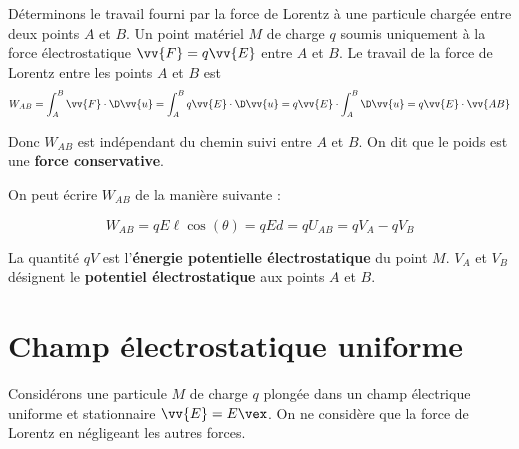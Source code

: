 \documentclass{cours}
\begin{document}
Déterminons le travail fourni par la force de Lorentz à une particule chargée entre deux points $A$ et $B$. Un point matériel $M$ de charge $q$ soumis uniquement à la force électrostatique $\vv{F} = q\vv{E}$ entre $A$ et $B$. Le travail de la force de Lorentz entre les points $A$ et $B$ est 
\begin{equation}
W_{AB} = \int_A^B\vv{F}\cdot\D \vv{u} = \int_A^B q\vv{E}\cdot\D \vv{u} = q\vv{E}\cdot\int_A^B\D\vv{u} = q\vv{E}\cdot\vv{AB}
\end{equation}

Donc $W_{AB}$ est indépendant du chemin suivi entre $A$ et $B$. On dit que le poids est une \textbf{force conservative}.

On peut écrire $W_{AB}$ de la manière suivante :
\begin{center}
\end{center}

\begin{equation}
W_{AB} = qE\ell\cos(\theta) = qEd = qU_{AB} = qV_A-qV_B 
\end{equation}

La quantité $qV$ est l'\textbf{énergie potentielle électrostatique} du point $M$. $V_A$ et $V_B$ désignent le \textbf{potentiel électrostatique} aux points $A$ et $B$.  
\section{Champ électrostatique uniforme}%
\label{sec:mouvement_dans_un_champ_electrique_uniforme}

Considérons une particule $M$ de charge $q$ plongée dans un champ électrique uniforme et stationnaire $\vv{E} = E \vex$. On ne considère que la force de Lorentz en négligeant les autres forces.
\end{document}
